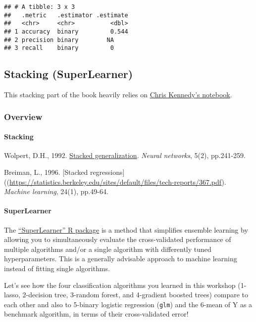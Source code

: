 \documentclass[
]{book}
\begin{document}
\begin{verbatim}
## # A tibble: 3 x 3
##   .metric   .estimator .estimate
##   <chr>     <chr>          <dbl>
## 1 accuracy  binary         0.544
## 2 precision binary        NA    
## 3 recall    binary         0
\end{verbatim}

\hypertarget{stacking-superlearner}{%
\subsection{Stacking (SuperLearner)}\label{stacking-superlearner}}

This stacking part of the book heavily relies on \href{https://github.com/dlab-berkeley/Machine-Learning-in-R/blob/master/07-ensembles.Rmd}{Chris Kennedy's notebook}.

\hypertarget{overview-1}{%
\subsubsection{Overview}\label{overview-1}}

\hypertarget{stacking}{%
\paragraph{Stacking}\label{stacking}}

Wolpert, D.H., 1992. \href{http://citeseerx.ist.psu.edu/viewdoc/summary?doi=10.1.1.56.1533}{Stacked generalization}. \emph{Neural networks}, 5(2), pp.241-259.

Breiman, L., 1996. {[}Stacked regressions{]}((\url{https://statistics.berkeley.edu/sites/default/files/tech-reports/367.pdf}). \emph{Machine learning}, 24(1), pp.49-64.

\hypertarget{superlearner}{%
\paragraph{SuperLearner}\label{superlearner}}

The \href{https://cran.r-project.org/web/packages/SuperLearner/index.html}{``SuperLearner'' R package} is a method that simplifies ensemble learning by allowing you to simultaneously evaluate the cross-validated performance of multiple algorithms and/or a single algorithm with differently tuned hyperparameters. This is a generally advisable approach to machine learning instead of fitting single algorithms.

Let's see how the four classification algorithms you learned in this workshop (1-lasso, 2-decision tree, 3-random forest, and 4-gradient boosted trees) compare to each other and also to 5-binary logistic regression (\texttt{glm}) and the 6-mean of Y as a benchmark algorithm, in terms of their cross-validated error!
\end{document}

